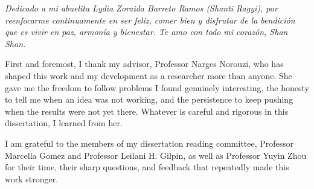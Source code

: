 \documentclass[11pt]{ucthesis}
\begin{document}
\begin{frontmatter}
\begin{dedication}
\vspace*{2in}
\begin{center}
\textit{Dedicado a mi abuelita Lydia Zoraida Barreto Ramos (Shanti Ragyi), por reenfocarme continuamente en ser feliz, comer bien y disfrutar de la bendición que es vivir en paz, armonía y bienestar. Te amo con todo mi corazón, Shan Shan.}
\end{center}
\end{dedication}

\begin{acknowledgements}


First and foremost, I thank my advisor, Professor Narges Norouzi, who has shaped this
work and my development as a researcher more than anyone. She gave me the freedom to
follow problems I found genuinely interesting, the honesty to tell me when an idea was
not working, and the persistence to keep pushing when the results were not yet there.
Whatever is careful and rigorous in this dissertation, I learned from her.

I am grateful to the members of my dissertation reading committee, Professor Marcella
Gomez and Professor Leilani H. Gilpin, as well as Professor Yuyin Zhou for their time, their sharp questions, and
feedback that repeatedly made this work stronger.


\end{acknowledgements}
\end{frontmatter}
\end{document}
